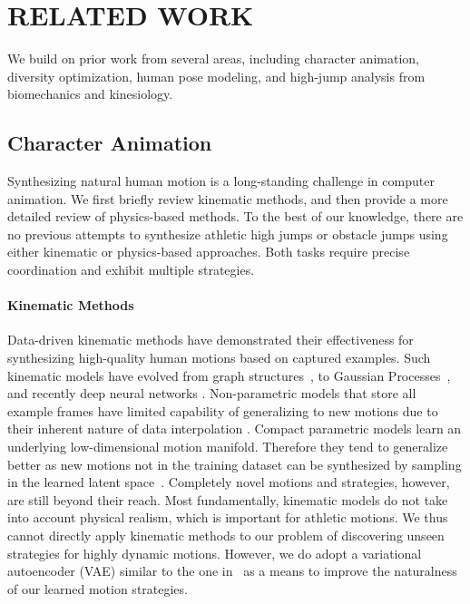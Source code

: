 \section{RELATED WORK}

We build on prior work from several areas,
including character animation, diversity optimization, human pose modeling, and high-jump analysis from biomechanics and kinesiology.

\subsection{Character Animation}
Synthesizing natural human motion is a long-standing challenge in computer animation. We first briefly review kinematic methods, and then provide a more detailed review of physics-based methods. To the best of our knowledge, there are no previous attempts to synthesize athletic high jumps or obstacle jumps using either kinematic or physics-based approaches. Both tasks require precise coordination and exhibit multiple strategies.

\paragraph{Kinematic Methods} 
Data-driven kinematic methods have demonstrated their effectiveness for synthesizing high-quality human motions based on captured examples. Such kinematic models have evolved from graph structures~\cite{Kovar:2002:MotionGraphs,Safonova-Interpolated-Motion-Graphs}, to Gaussian Processes~\cite{levine2012continuous, ye2010synthesis-responsive}, and recently deep neural networks \cite{Holden:2017:PFNN, Zhang:2018:MANN, starke2019neural-state-machine, starke2020local-motion-phases, lee2018interactive-RNN, Ling20}. Non-parametric models that store all example frames have limited capability of generalizing to new motions due to their inherent nature of data interpolation \cite{Clavet16}. Compact parametric models learn an underlying low-dimensional motion manifold. Therefore they tend to generalize better as new motions not in the training dataset can be synthesized by sampling in the learned latent space~\cite{Holden16}. Completely novel motions and strategies, however, are still beyond their reach. Most fundamentally, kinematic models do not take into account physical realism, which is important for athletic motions. We thus cannot directly apply kinematic methods to our problem of discovering unseen strategies for highly dynamic motions. However, we do adopt a variational autoencoder (VAE) similar to the one in~\cite{Ling20} as a means to
improve the naturalness of our learned motion strategies.

